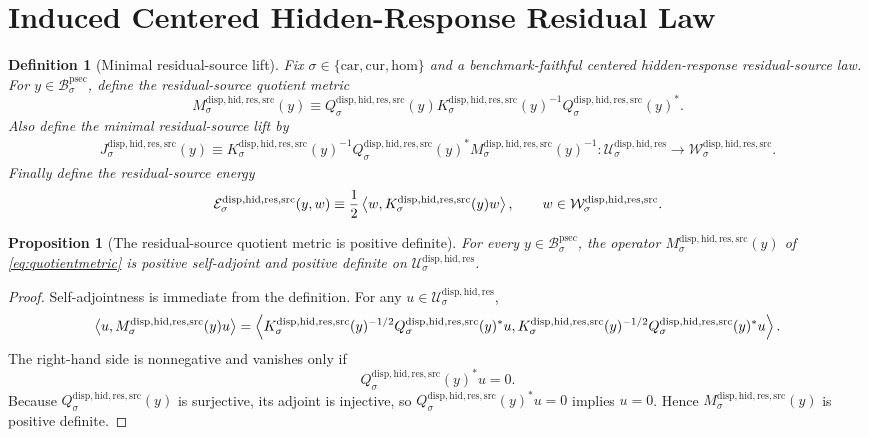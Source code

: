 \documentclass[11pt]{article}
\newcommand{\Car}{\mathrm{car}}
\newcommand{\Cur}{\mathrm{cur}}
\newcommand{\Hom}{\mathrm{hom}}
\newcommand{\ProtoSectionBody}[1]{\mathcal B_{#1}^{\mathrm{psec}}}
\newcommand{\ResidualState}[1]{\mathcal U_{#1}^{\mathrm{disp,hid,res}}}
\newcommand{\ResidualSourceCarrier}[1]{\mathcal W_{#1}^{\mathrm{disp,hid,res,src}}}
\newcommand{\ResidualSourceProjection}[1]{Q_{#1}^{\mathrm{disp,hid,res,src}}}
\newcommand{\ResidualSourceOperator}[1]{K_{#1}^{\mathrm{disp,hid,res,src}}}
\newcommand{\ResidualSourceLift}[1]{J_{#1}^{\mathrm{disp,hid,res,src}}}
\newcommand{\ResidualSourceQuotientMetric}[1]{M_{#1}^{\mathrm{disp,hid,res,src}}}
\newcommand{\ResidualSourceEnergy}[1]{\mathcal E_{#1}^{\mathrm{disp,hid,res,src}}}
\newtheorem{definition}{Definition}
\newtheorem{proposition}{Proposition}
\begin{document}
\section{Induced Centered Hidden-Response Residual Law}

\begin{definition}[Minimal residual-source lift]
\label{def:lift}
Fix \(\sigma\in\{\Car,\Cur,\Hom\}\) and a benchmark-faithful centered hidden-response residual-source law. For \(y\in\ProtoSectionBody{\sigma}\), define the residual-source quotient metric
\begin{equation}
\ResidualSourceQuotientMetric{\sigma}(y)
\equiv
\ResidualSourceProjection{\sigma}(y)
\ResidualSourceOperator{\sigma}(y)^{-1}
\ResidualSourceProjection{\sigma}(y)^*.
\label{eq:quotientmetric}
\end{equation}
Also define the minimal residual-source lift by
\begin{equation}
\begin{aligned}
\ResidualSourceLift{\sigma}(y)
\equiv
\ResidualSourceOperator{\sigma}(y)^{-1}
\ResidualSourceProjection{\sigma}(y)^*
\ResidualSourceQuotientMetric{\sigma}(y)^{-1}
:
\ResidualState{\sigma}\to\ResidualSourceCarrier{\sigma}.
\end{aligned}
\label{eq:minlift}
\end{equation}
Finally define the residual-source energy
\[
\ResidualSourceEnergy{\sigma}(y,w)
\equiv
\frac{1}{2}
\ev{
w,\ResidualSourceOperator{\sigma}(y)w
},
\qquad
w\in\ResidualSourceCarrier{\sigma}.
\]
\end{definition}

\begin{proposition}[The residual-source quotient metric is positive definite]
\label{prop:quotientmetric}
For every \(y\in\ProtoSectionBody{\sigma}\), the operator \(\ResidualSourceQuotientMetric{\sigma}(y)\) of \eqref{eq:quotientmetric} is positive self-adjoint and positive definite on \(\ResidualState{\sigma}\).
\end{proposition}

\begin{proof}
Self-adjointness is immediate from the definition. For any \(u\in\ResidualState{\sigma}\),
\[
\ev{
u,\ResidualSourceQuotientMetric{\sigma}(y)u
}
=
\ev{
\ResidualSourceOperator{\sigma}(y)^{-1/2}
\ResidualSourceProjection{\sigma}(y)^*u,
\ResidualSourceOperator{\sigma}(y)^{-1/2}
\ResidualSourceProjection{\sigma}(y)^*u
}.
\]
The right-hand side is nonnegative and vanishes only if
\[
\ResidualSourceProjection{\sigma}(y)^*u=0.
\]
Because \(\ResidualSourceProjection{\sigma}(y)\) is surjective, its adjoint is injective, so \(\ResidualSourceProjection{\sigma}(y)^*u=0\) implies \(u=0\). Hence \(\ResidualSourceQuotientMetric{\sigma}(y)\) is positive definite.
\end{proof}
\end{document}

